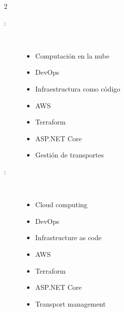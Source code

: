 \begin{multicols}{2}
\begin{description}
\item [\palabraschaveprincipal:] \mbox{} \\[-20pt]
  \begin{itemize}
    \item Computación en la nube
    \item DevOps
    \item Infraestructura como código
    \item AWS
    \item Terraform
    \item ASP.NET Core
    \item Gestión de transportes
  \end{itemize}
\end{description}
\begin{description}
\item [\palabraschavesecundaria:] \mbox{} \\[-20pt]
  \begin{itemize}
    \item Cloud computing
    \item DevOps
    \item Infrastructure as code
    \item AWS
    \item Terraform
    \item ASP.NET Core
    \item Transport management
  \end{itemize}
\end{description}
\end{multicols}
